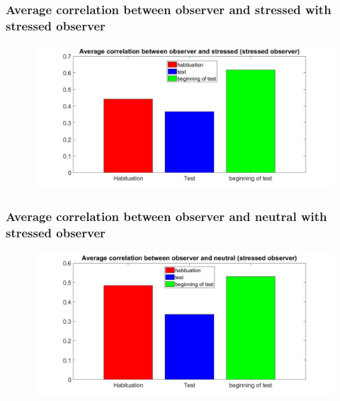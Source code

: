 \documentclass{beamer}
\begin{document}
\begin{frame}
\frametitle{ Average correlation between observer and stressed with stressed observer}



\begin{figure}[H]
\begin{center}
	\hspace*{-1.7cm}
	\includegraphics[scale=.32]{avg_corr_stress2.jpg} 
\end{center}  


\end{figure}

\end{frame}



\begin{frame}
\frametitle{ Average correlation between observer and neutral with stressed observer}



\begin{figure}[H]
\begin{center}
\hspace*{-1.7cm}
\includegraphics[scale=.32]{avg_corr_neut2.jpg} 
\end{center}  


\end{figure}

\end{frame}
\end{document}
